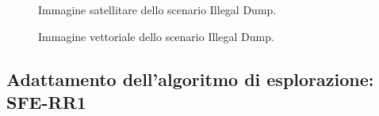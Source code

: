 \begin{figure}[H] 
    \captionsetup{justification=centering, margin=2cm, font=footnotesize}
    \begin{center}
    \end{center}
    \caption{Immagine satellitare dello scenario Illegal Dump.}
    \label{dump_map}
\end{figure}

\begin{figure}[H] 
    \captionsetup{justification=centering, margin=2cm, font=footnotesize}
    \begin{center}
    \end{center}
    \caption{Immagine vettoriale dello scenario Illegal Dump.}
    \label{dump_scenario}
\end{figure}

\subsection{Adattamento dell'algoritmo di esplorazione: SFE-RR1} \label{paragrafo_esplorazione_sciadro}

